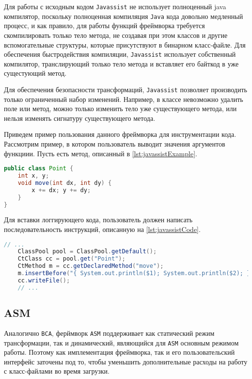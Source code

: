 Для работы с исходным кодом \texttt{Javassist} не использует полноценный java компилятор, поскольку полноценная компиляция \texttt{Java} кода довольно медленный процесс, и как правило, для работы функций фреймворка требуется скомпилировать только тело метода, не создавая при этом классов и другие вспомогательные структуры, которые присутствуют в бинарном класс-файле. Для обеспечения быстродействия компиляции, \texttt{Javassist} использует собственный компилятор, транслирующий только тело метода и вставляет его байткод в уже сущестующий метод.

Для обеспечения безопасности трансформаций, \texttt{Javassist} позволяет производить только ограниченный набор изменений. Например, в классе невозможно удалить поле или метод, можно только изменить тело уже существующего метода, или нельзя изменять сигнатуру существующего метода.

Приведем пример пользования данного фреймворка для инструментации кода. Рассмотрим пример, в котором пользователь выводит значения аргументов функциии. Пусть есть метод, описанный в \autoref{lst:javassistExample}.

\begin{lstlisting}[language=Java, caption=Исходный класс, label=lst:javassistExample]
public class Point {
    int x, y;
    void move(int dx, int dy) {
        x += dx; y += dy;
    }
}
\end{lstlisting}

Для вставки логгирующего кода, пользователь должен написать последовательность инструкций, описанную на \autoref{lst:javassistCode}.

\begin{lstlisting}[language=Java, caption={Код, добавляющий логгирование}, label=lst:javassistCode]
    // ...
    ClassPool pool = ClassPool.getDefault();
    CtClass cc = pool.get("Point");
    CtMethod m = cc.getDeclaredMethod("move");
    m.insertBefore("{ System.out.println($1); System.out.println($2); }");
    cc.writeFile();
    // ...
\end{lstlisting}

\subsection{ASM}

Аналогично \texttt{BCA}, ферймворк \texttt{ASM} \cite{asm} поддерживает как статический режим трансформации, так и динамический, являющийся для \texttt{ASM} основным режимом работы. Поэтому как имплементация фреймворка, так и его пользовательский интерфейс заточены под то, чтобы уменьшить дополнительные расходы на работу с класс-файлами во время загрузки.

